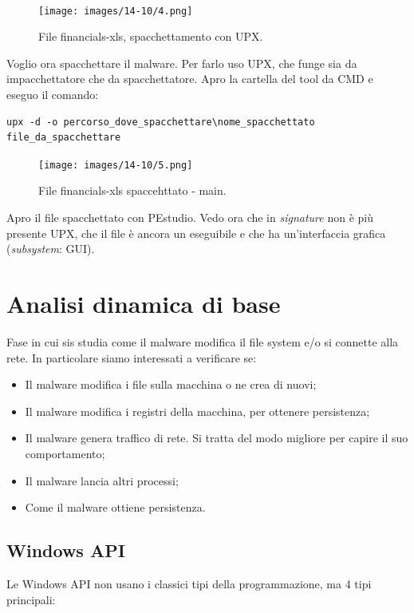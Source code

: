 \documentclass[a4paper]{book}
\begin{document}
\\
\begin{figure}[p]
    \texttt{[image: images/14-10/4.png]}
    \caption{File financials-xls, spacchettamento con UPX.}
\end{figure}

Voglio ora spacchettare il malware. Per farlo uso UPX, che funge sia da impacchettatore che da spacchettatore. Apro la cartella del tool da CMD e eseguo il comando:
\begin{lstlisting}
upx -d -o percorso_dove_spacchettare\nome_spacchettato file_da_spacchettare 
\end{lstlisting}

\begin{figure}[p]
    \texttt{[image: images/14-10/5.png]}
    \caption{File financials-xls spaccehttato - main.}
\end{figure}

Apro il file spacchettato con PEstudio. Vedo ora che in \textit{signature} non è più presente UPX, che il file è ancora un eseguibile e che ha un'interfaccia grafica (\textit{subsystem}: GUI).











\chapter{Analisi dinamica di base}

Fase in cui sis studia come il malware modifica il file system e/o si connette alla rete. In particolare siamo interessati a verificare se:
\begin{itemize}
    \item Il malware modifica i file sulla macchina o ne crea di nuovi;
    \item Il malware modifica i registri della macchina, per ottenere persistenza;
    \item Il malware genera traffico di rete. Si tratta del modo migliore per capire il suo comportamento;
    \item Il malware lancia altri processi;
    \item Come il malware ottiene persistenza.
\end{itemize}

\section{Windows API}
Le Windows API non usano i classici tipi della programmazione, ma 4 tipi principali:
\end{document}
